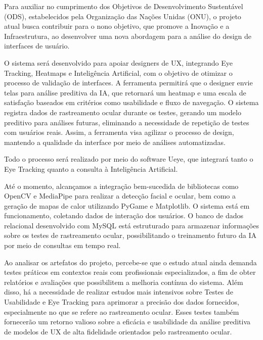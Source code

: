 Para auxiliar no cumprimento dos Objetivos de Desenvolvimento Sustentável (ODS), estabelecidos pela Organização das Nações Unidas (ONU), o projeto atual busca contribuir para o nono objetivo, que promove a Inovação e a Infraestrutura, ao desenvolver uma nova abordagem para a análise do design de interfaces de usuário. \textcite{ODS2024}

O sistema será desenvolvido para apoiar designers de UX, integrando Eye Tracking, Heatmaps e Inteligência Artificial, com o objetivo de otimizar o processo de validação de interfaces. A ferramenta permitirá que o designer envie telas para análise preditiva da IA, que retornará um heatmap e uma escala de satisfação baseados em critérios como usabilidade e fluxo de navegação. O sistema registra dados de rastreamento ocular durante os testes, gerando um modelo preditivo para análises futuras, eliminando a necessidade de repetição de testes com usuários reais. Assim, a ferramenta visa agilizar o processo de design, mantendo a qualidade da interface por meio de análises automatizadas.

Todo o processo será realizado por meio do software Ueye, que integrará tanto o Eye Tracking quanto a consulta à Inteligência Artificial.

Até o momento, alcançamos a integração bem-sucedida de bibliotecas como OpenCV e MediaPipe para realizar a detecção facial e ocular, bem como a geração de mapas de calor utilizando PyGame e Matplotlib. O sistema está em funcionamento, coletando dados de interação dos usuários. O banco de dados relacional desenvolvido com MySQL está estruturado para armazenar informações sobre os testes de rastreamento ocular, possibilitando o treinamento futuro da IA por meio de consultas em tempo real.

Ao analisar os artefatos do projeto, percebe-se que o estudo atual ainda demanda testes práticos em contextos reais com profissionais especializados, a fim de obter relatórios e avaliações que possibilitem a melhoria contínua do sistema. Além disso, há a necessidade de realizar estudos mais intensivos sobre Testes de Usabilidade e Eye Tracking para aprimorar a precisão dos dados fornecidos, especialmente no que se refere ao rastreamento ocular. Esses testes também fornecerão um retorno valioso sobre a eficácia e usabilidade da análise preditiva de modelos de UX de alta fidelidade orientados pelo rastreamento ocular.

